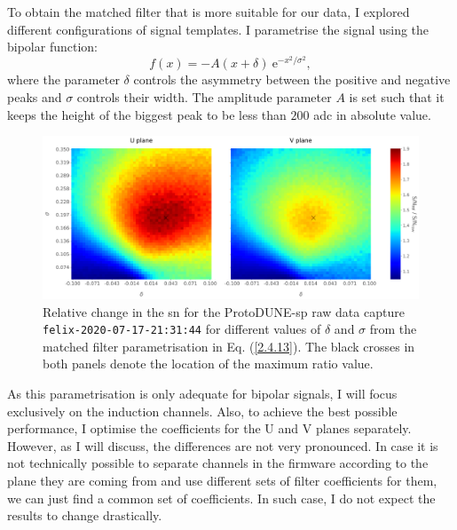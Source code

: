 To obtain the matched filter that is more suitable for our data, I explored different configurations of signal templates. I parametrise the signal using the bipolar function:
\begin{equation}\label{2.4.13}
	f(x) = -A (x + \delta) \ \mathrm{e}^{-x^{2}/\sigma^{2}},
\end{equation}
where the parameter $\delta$ controls the asymmetry between the positive and negative peaks and $\sigma$ controls their width. The amplitude parameter $A$ is set such that it keeps the height of the biggest peak to be less than $200$ \gls{adc} in absolute value.

\begin{figure}[t]
	\centering
	\includegraphics[width=1\linewidth]{Images/Matched_Filter/mf_fir_opt.png}
	\caption[Relative change in the \gls{sn} for the ProtoDUNE-\gls{sp} raw data capture for different values of $\delta$ and $\sigma$ from the matched filter parametrisation.]{Relative change in the \gls{sn} for the ProtoDUNE-\gls{sp} raw data capture \texttt{felix-2020-07-17-21:31:44} for different values of $\delta$ and $\sigma$ from the matched filter parametrisation in Eq. (\ref{2.4.13}). The black crosses in both panels denote the location of the maximum ratio value.}
	\label{fig:mf_opt}
\end{figure}

As this parametrisation is only adequate for bipolar signals, I will focus exclusively on the induction channels. Also, to achieve the best possible performance, I optimise the coefficients for the U and V planes separately. However, as I will discuss, the differences are not very pronounced. In case it is not technically possible to separate channels in the firmware according to the plane they are coming from and use different sets of filter coefficients for them, we can just find a common set of coefficients. In such case, I do not expect the results to change drastically.

